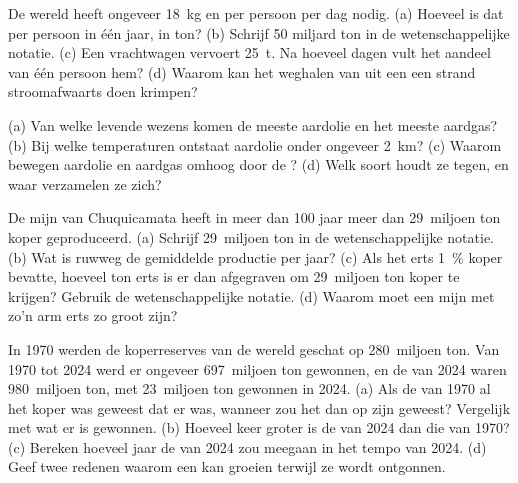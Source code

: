 \begin{exercise}[$\star\star$]\label{exo:g9:earth-resources:8}
De wereld heeft ongeveer \qty{18}{kg}  en  per persoon per dag
nodig. (a) Hoeveel is dat per persoon in één jaar, in ton? (b) Schrijf 50
miljard ton in de wetenschappelijke notatie. (c) Een vrachtwagen vervoert
\qty{25}{t}. Na hoeveel dagen vult het aandeel van één persoon hem?
(d) Waarom kan het weghalen van  uit een  een strand
stroomafwaarts doen krimpen?
\end{exercise}

\begin{exercise}[$\star\star$]\label{exo:g9:earth-resources:9}
(a) Van welke levende wezens komen de meeste aardolie en het meeste
aardgas? (b) Bij welke temperaturen ontstaat aardolie onder ongeveer
\qty{2}{km}? (c) Waarom bewegen aardolie en aardgas omhoog door de
? (d) Welk soort  houdt ze tegen, en waar verzamelen ze
zich?
\end{exercise}

\begin{exercise}[$\star\star$]\label{exo:g9:earth-resources:10}
De mijn van Chuquicamata heeft in meer dan 100 jaar meer dan 29~miljoen
ton koper geproduceerd. (a) Schrijf 29~miljoen ton in de
wetenschappelijke notatie. (b) Wat is ruwweg de gemiddelde productie per
jaar? (c) Als het erts \qty{1}{\%} koper bevatte, hoeveel ton erts is er
dan afgegraven om 29~miljoen ton koper te krijgen? Gebruik de
wetenschappelijke notatie. (d) Waarom moet een mijn met zo'n arm erts zo
groot zijn?
\end{exercise}

\begin{exercise}[$\star\star\star$]\label{exo:g9:earth-resources:11}
In 1970 werden de koperreserves van de wereld geschat op 280~miljoen ton.
Van 1970 tot 2024 werd er ongeveer 697~miljoen ton gewonnen, en de
 van 2024 waren 980~miljoen ton, met 23~miljoen ton gewonnen in
2024. (a) Als de  van 1970 al het koper was geweest dat er was,
wanneer zou het dan op zijn geweest? Vergelijk met wat er is gewonnen.
(b) Hoeveel keer groter is de  van 2024 dan die van 1970?
(c) Bereken hoeveel jaar de  van 2024 zou meegaan in het tempo van
2024. (d) Geef twee redenen waarom een  kan groeien terwijl ze
wordt ontgonnen.
\end{exercise}

